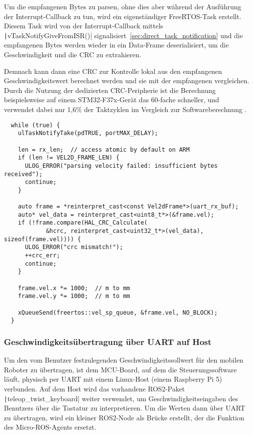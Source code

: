 Um die empfangenen Bytes zu parsen, ohne dies aber während der Ausführung der
Interrupt-Callback zu tun, wird ein eigenständiger FreeRTOS-Task erstellt.
Diesem Task wird von der Interrupt-Callback mittels
\texttt|vTaskNotifyGiveFromISR()|
signalisiert~\ref{sec:direct_task_notification} und die empfangenen Bytes werden
wieder in ein Data-Frame deserialisiert, um die Geschwindigkeit und die CRC zu
extrahieren.

Demnach kann dann eine CRC zur Kontrolle lokal aus den empfangenen
Geschwindigkeitswert berechnet werden und sie mit der empfangenen vergleichen.
Durch die Nutzung der dedizierten CRC-Peripherie ist die Berechnung
beispielsweise auf einem STM32-F37x-Gerät das 60-fache schneller, und verwendet
dabei nur 1,6\% der Taktzyklen im Vergleich zur Softwareberechnung \cite[S.
9]{AN4187}.

\begin{code}
\begin{verbatim}
  while (true) {
    ulTaskNotifyTake(pdTRUE, portMAX_DELAY);

    len = rx_len;  // access atomic by default on ARM
    if (len != VEL2D_FRAME_LEN) {
      ULOG_ERROR("parsing velocity failed: insufficient bytes received");
      continue;
    }

    auto frame = *reinterpret_cast<const Vel2dFrame*>(uart_rx_buf);
    auto* vel_data = reinterpret_cast<uint8_t*>(&frame.vel);
    if (!frame.compare(HAL_CRC_Calculate(
            &hcrc, reinterpret_cast<uint32_t*>(vel_data), sizeof(frame.vel)))) {
      ULOG_ERROR("crc mismatch!");
      ++crc_err;
      continue;
    }

    frame.vel.x *= 1000;  // m to mm
    frame.vel.y *= 1000;  // m to mm

    xQueueSend(freertos::vel_sp_queue, &frame.vel, NO_BLOCK);
  }
\end{verbatim}
\end{code}

\subsubsection{Geschwindigkeitsübertragung über UART auf Host}

Um den vom Benutzer festzulegenden Geschwindigkeitssollwert für den mobilen
Roboter zu übertragen, ist dem MCU-Board, auf dem die Steuerungssoftware läuft,
physisch per UART mit einem Linux-Host (einem Raspberry Pi 5) verbunden. Auf dem
Host wird das vorhandene ROS2-Paket \texttt|teleop_twist_keyboard|
weiter verwendet, um Geschwindigkeitseingaben des Benutzers über die Tastatur zu
interpretieren. Um die Werten dann über UART zu übertragen, wird ein kleiner
ROS2-Node als Brücke erstellt, der die Funktion des Micro-ROS-Agents ersetzt.

